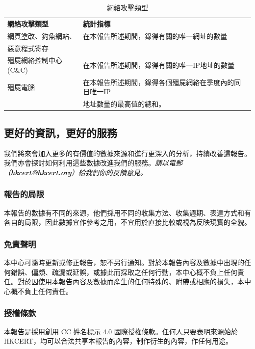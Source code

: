 \documentclass[14pt]{extarticle}
\begin{document}
\begin{table}[h]
\centering
\caption{網絡攻擊類型}
\begin{tabular}{ll}
\hline
\textbf{網絡攻擊類型}              & \textbf{統計指標}                                                                         \\\hhline{==}
網頁塗改、釣魚網站、                     & 在本報告所述期間，錄得有關的唯一網址的數量 \\
惡意程式寄存                            & \\\hline

殭屍網絡控制中心(C\&C)                    & 在本報告所述期間，錄得有關的唯一IP地址的數量 \\\hline
殭屍電腦                               & 在本報告所述期間，錄得各個殭屍網絡在季度內的同日唯一IP  \\
                                      & 地址數量的最高值的總和。 \\\hline
\end{tabular}

\end{table}

\subsection*{更好的資訊，更好的服務}

我們將來會加入更多的有價值的數據來源和進行更深入的分析，持續改善這報告。我們亦會探討如何利用這些數據改進我們的服務。\textit{請以電郵（\textbf{hkcert@hkcert.org}）給我們你的反饋意見。}

\subsubsection*{報告的局限}

本報告的數據有不同的來源，他們採用不同的收集方法、收集週期、表達方式和有各自的局限，因此數據宜作參考之用，不宜用於直接比較或視為反映現實的全貌。

\subsubsection*{免責聲明}
本中心可隨時更新或修正報告，恕不另行通知。對於本報告內容及數據中出現的任何錯誤、偏頗、疏漏或延誤，或據此而採取之任何行動，本中心概不負上任何責任。對於因使用本報告內容及數據而產生的任何特殊的、附帶或相應的損失，本中心概不負上任何責任。

\subsubsection*{授權條款}
本報告是採用創用 CC 姓名標示 4.0 國際授權條款。任何人只要表明來源始於HKCERT，均可以合法共享本報告的內容，制作衍生的內容，作任何用途。
\end{document}
